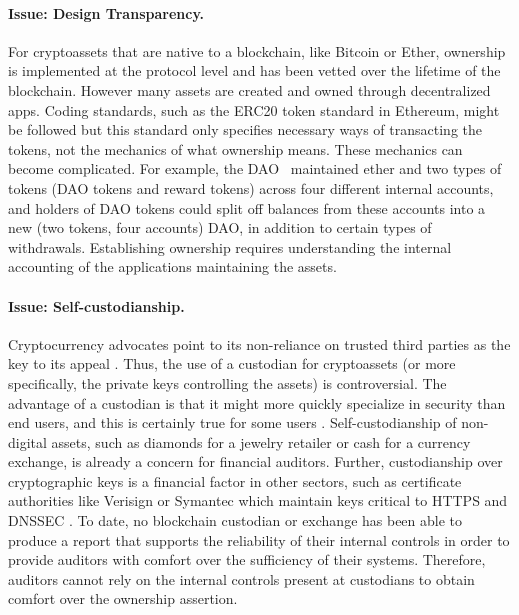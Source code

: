 \paragraph{Issue: Design Transparency.} For cryptoassets that are native to a blockchain, like Bitcoin or Ether, ownership is implemented at the protocol level and has been vetted over the lifetime of the blockchain. However many assets are created and owned through decentralized apps. Coding standards, such as the ERC20 token standard in Ethereum, might be followed but this standard only specifies necessary ways of transacting the tokens, not the mechanics of what ownership means. These mechanics can become complicated. For example, the DAO~\cite{jentzsch2016decentralized} maintained ether and two types of tokens (DAO tokens and reward tokens) across four different internal accounts, and holders of DAO tokens could split off balances from these accounts into a new (two tokens, four accounts) DAO, in addition to certain types of withdrawals. Establishing ownership requires understanding the internal accounting of the applications maintaining the assets. 

\paragraph{Issue: Self-custodianship.} Cryptocurrency advocates point to its non-reliance on trusted third parties as the key to its appeal . Thus, the use of a custodian for cryptoassets (or more specifically, the private keys controlling the assets) is controversial. The advantage of a custodian is that it might more quickly specialize in security than end users, and this is certainly true for some users . Self-custodianship of non-digital assets, such as diamonds for a jewelry retailer or cash for a currency exchange, is already a concern for financial auditors. Further, custodianship over cryptographic keys is a financial factor in other sectors, such as certificate authorities like Verisign or Symantec which maintain keys critical to HTTPS and DNSSEC \todo{[cite]}. To date, no blockchain custodian or exchange has been able to produce a report that supports the reliability of their internal controls in order to provide auditors with comfort over the sufficiency of their systems. Therefore, auditors cannot rely on the internal controls present at custodians to obtain comfort over the ownership assertion. 

